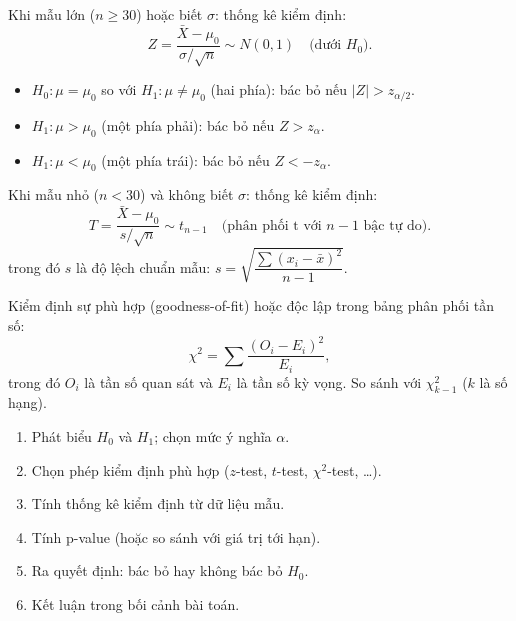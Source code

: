 \documentclass[12pt,a4paper]{article}
\begin{document}
\begin{congthuc}[title={Kiểm định $z$ (Z-test) -- trung bình tổng thể}]
  Khi mẫu lớn ($n \ge 30$) hoặc biết $\sigma$: thống kê kiểm định:
  \[
    Z = \frac{\bar{X} - \mu_0}{\sigma/\sqrt{n}} \sim N(0,1) \quad \text{(dưới } H_0).
  \]
  \begin{itemize}
    \item $H_0: \mu = \mu_0$ so với $H_1: \mu \ne \mu_0$ (hai phía): bác bỏ nếu $|Z| > z_{\alpha/2}$.
    \item $H_1: \mu > \mu_0$ (một phía phải): bác bỏ nếu $Z > z_\alpha$.
    \item $H_1: \mu < \mu_0$ (một phía trái): bác bỏ nếu $Z < -z_\alpha$.
  \end{itemize}
\end{congthuc}

\begin{congthuc}[title={Kiểm định $t$ (T-test) -- mẫu nhỏ}]
  Khi mẫu nhỏ ($n < 30$) và không biết $\sigma$: thống kê kiểm định:
  \[
    T = \frac{\bar{X} - \mu_0}{s/\sqrt{n}} \sim t_{n-1} \quad \text{(phân phối t với } n-1 \text{ bậc tự do)}.
  \]
  trong đó $s$ là độ lệch chuẩn mẫu: $s = \sqrt{\dfrac{\sum(x_i - \bar{x})^2}{n-1}}$.
\end{congthuc}

\begin{congthuc}[title={Kiểm định Chi-squared ($\chi^2$)}]
  Kiểm định sự phù hợp (goodness-of-fit) hoặc độc lập trong bảng phân phối tần số:
  \[
    \chi^2 = \sum \frac{(O_i - E_i)^2}{E_i},
  \]
  trong đó $O_i$ là tần số quan sát và $E_i$ là tần số kỳ vọng. So sánh với $\chi^2_{k-1}$ ($k$ là số hạng).
\end{congthuc}

\begin{phuongphap}[title={Quy trình kiểm định giả thuyết}]
  \begin{enumerate}
    \item Phát biểu $H_0$ và $H_1$; chọn mức ý nghĩa $\alpha$.
    \item Chọn phép kiểm định phù hợp ($z$-test, $t$-test, $\chi^2$-test, \ldots).
    \item Tính thống kê kiểm định từ dữ liệu mẫu.
    \item Tính p-value (hoặc so sánh với giá trị tới hạn).
    \item Ra quyết định: bác bỏ hay không bác bỏ $H_0$.
    \item Kết luận trong bối cảnh bài toán.
  \end{enumerate}
\end{phuongphap}
\end{document}
